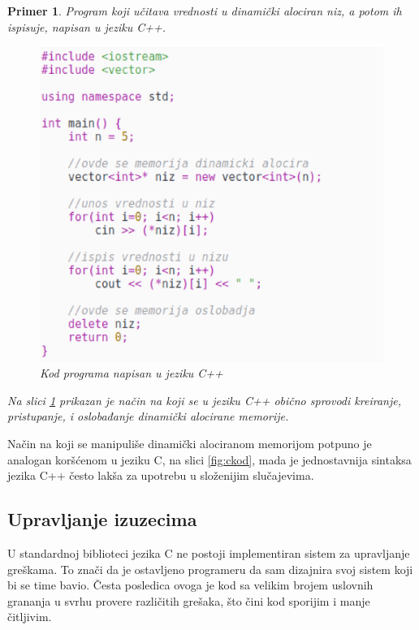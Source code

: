 \documentclass[a4paper]{article}
\newtheorem{primer}{Primer}[section]
\begin{document}
\begin{primer} Program koji učitava vrednosti u dinamički alociran niz, a potom ih ispisuje, napisan u jeziku C++.

\begin{figure}[h!]
\begin{center}
\includegraphics[scale=0.4]{cpp_kod_dinamicka_alokacija.eps}
\end{center}
\caption{Kod programa napisan u jeziku C++}
\label{fig:cppkod}
\end{figure}

Na slici \ref{fig:cppkod} prikazan je način na koji se u jeziku C++ obično sprovodi kreiranje, pristupanje, i oslobađanje dinamički alocirane memorije.
\end{primer}

Način na koji se manipuliše dinamički alociranom memorijom potpuno je analogan koršćenom u jeziku C, na slici \ref{fig:ckod}, mada je jednostavnija sintaksa jezika C++ često lakša za upotrebu u složenijim slučajevima.


\subsection{Upravljanje izuzecima}

U standardnoj biblioteci jezika C ne postoji implementiran sistem za upravljanje greškama. To znači da je ostavljeno programeru da sam dizajnira svoj sistem koji bi se time bavio. Česta posledica ovoga je kod sa velikim brojem uslovnih grananja u svrhu provere različitih grešaka, što čini kod sporijim i manje čitljivim.
\end{document}
